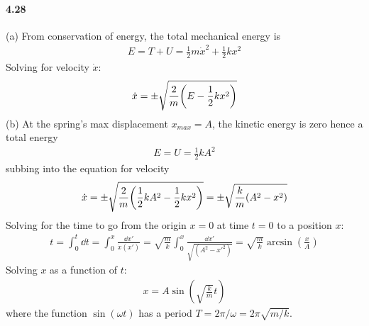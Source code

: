 \documentclass[../problems.tex]{subfiles}
\begin{document}
\paragraph{4.28}
(a) From conservation of energy, the total mechanical energy is
\begin{align*}
    E = T + U = \frac{1}{2} m \dot{x}^2 + \frac{1}{2} k x^2
\end{align*}
Solving for velocity $\dot{x}$:
\begin{align*}
    \dot{x} = \pm \sqrt{\frac{2}{m} \quantity(E - \frac{1}{2} k x^2)}
\end{align*}
(b) At the spring's max displacement $x_{max} = A$, the kinetic energy is zero hence a total energy
\begin{align*}
    E = U = \frac{1}{2} k A^2
\end{align*}
subbing into the equation for velocity
\begin{align*}
    \dot{x} = \pm \sqrt{\frac{2}{m} \quantity(\frac{1}{2} k A^2 - \frac{1}{2} k x^2)}
    = \pm \sqrt{\frac{k}{m} \quantity(A^2 - x^2)}
\end{align*}
Solving for the time to go from the origin $x=0$ at time $t=0$ to a position $x$:
\begin{align*}
    t = \int_0^t \dd{t} = \int_0^x \frac{\dd{x'}}{\dot{x}(x')} 
    = \sqrt{\frac{m}{k}} \int_0^x \frac{\dd{x'}}{\sqrt{(A^2 - x'^2)}}
    = \sqrt{\frac{m}{k}} \arcsin(\frac{x}{A})
\end{align*}
Solving $x$ as a function of $t$:
\begin{align*}
    x = A \sin(\sqrt{\frac{k}{m}} t)
\end{align*}
where the function $\sin(\omega t)$ has a period $T = 2\pi / \omega = 2\pi \sqrt{m/k}$.
\end{document}
